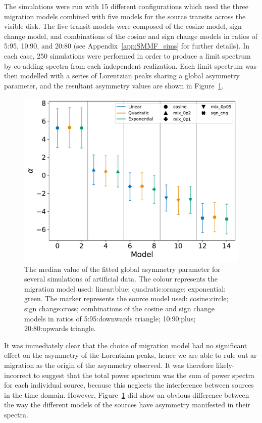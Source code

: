 The simulations were run with 15 different configurations which used the three migration models combined with five models for the source transits across the visible disk. The five transit models were composed of the cosine model, sign change model, and combinations of the cosine and sign change models in ratios of 5:95, 10:90, and 20:80 (see Appendix~\ref{app:SMMF_sims} for further details). In each case, 250 simulations were performed in order to produce a limit spectrum by co-adding spectra from each independent realization. Each limit spectrum was then modelled with a series of Lorentzian peaks sharing a global asymmetry parameter, and the resultant asymmetry values are shown in Figure~\ref{fig:artificial_asymm}.

\begin{figure}[ht!]
	\centering
	\includegraphics[width=0.85\columnwidth]{artificial_fit_asym.pdf}
	\caption{The median value of the fitted global asymmetry parameter for several simulations of artificial data. The colour represents the migration model used: linear:blue; quadratic:orange; exponential: green. The marker represents the source model used: cosine:circle; sign change:cross; combinations of the cosine and sign change models in ratios of 5:95:downwards triangle; 10:90:plus; 20:80:upwards triangle.}
	\label{fig:artificial_asymm}
\end{figure}

It was immediately clear that the choice of migration model had no significant effect on the asymmetry of the Lorentzian peaks, hence we are able to rule out \gls{ar} migration as the origin of the asymmetry observed. It was therefore likely-incorrect to suggest that the total power spectrum was the sum of power spectra for each individual source, because this neglects the interference between sources in the time domain. However, Figure~\ref{fig:artificial_asymm} did show an obvious difference between the way the different models of the sources have asymmetry manifested in their spectra.

